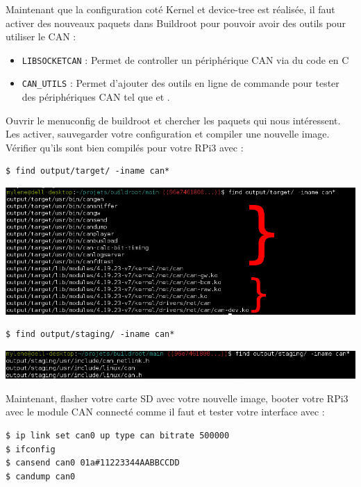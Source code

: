 Maintenant que la configuration coté Kernel et device-tree est réalisée, il
faut activer des nouveaux paquets dans Buildroot pour pouvoir avoir des
outils pour utiliser le CAN :
\begin{itemize}
\item \texttt{LIBSOCKETCAN} : Permet de controller un périphérique CAN via du code en C
\item \texttt{CAN\_UTILS} : Permet d'ajouter des outils en ligne de commande pour
  tester des périphériques CAN tel que  et .
\end{itemize}

Ouvrir le menuconfig de buildroot et chercher les paquets qui nous intéressent.
Les activer, sauvegarder votre configuration et compiler une nouvelle image.
Vérifier qu'ils sont bien compilés pour votre RPi3 avec :

\begin{verbatim}
$ find output/target/ -iname can*
\end{verbatim}

\begin{centering}
\includegraphics[height=0.2\textheight]{pictures/04_labs/output_target.jpg} \\
\end{centering}

\begin{verbatim}
$ find output/staging/ -iname can*
\end{verbatim}

\begin{centering}
\includegraphics[height=0.05\textheight]{pictures/04_labs/output_staging.jpg} \\
\end{centering}

Maintenant, flasher votre carte SD avec votre nouvelle image, booter votre
RPi3 avec le module CAN connecté comme il faut et tester votre interface
 avec :

\begin{verbatim}
$ ip link set can0 up type can bitrate 500000
$ ifconfig
$ cansend can0 01a#11223344AABBCCDD
$ candump can0
\end{verbatim}

